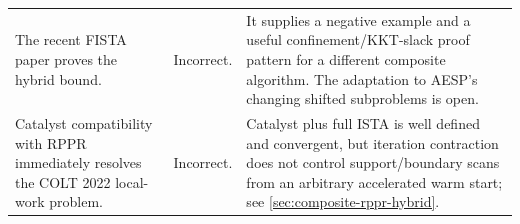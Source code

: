 \begin{table}[h]
\begin{tabularx}{\textwidth}{@{}p{}p{}X@{}}
The recent FISTA paper proves the hybrid bound.
& Incorrect.
& It supplies a negative example and a useful confinement/KKT-slack proof
pattern for a different composite algorithm.  The adaptation to AESP's
changing shifted subproblems is open. \\

Catalyst compatibility with RPPR immediately resolves the COLT 2022 local-work
problem.
& Incorrect.
& Catalyst plus full ISTA is well defined and convergent, but iteration
contraction does not control support/boundary scans from an arbitrary
accelerated warm start; see \cref{sec:composite-rppr-hybrid}. \\

\bottomrule
\end{tabularx}
\end{table}


